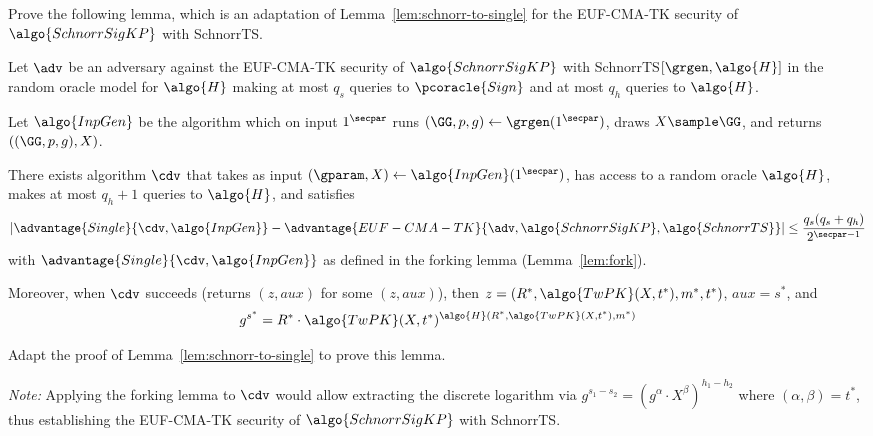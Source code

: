 \begin{exercise}\label{ex:schnorrkp-to-single}
  Prove the following lemma, which is an adaptation of Lemma~\ref{lem:schnorr-to-single} for the EUF-CMA-TK security of $\algo{SchnorrSigKP}$ with SchnorrTS.
  
  \begin{lemma}\label{lem:schnorrkp-to-single}
    Let $\adv$ be an adversary against the EUF-CMA-TK security of $\algo{SchnorrSigKP}$ with SchnorrTS$[\grgen, \algo{H}]$ in the random oracle model for $\algo{H}$ making at most $q_s$ queries to $\pcoracle{Sign}$ and at most $q_h$ queries to $\algo{H}$.
    
    Let $\algo{InpGen}$ be the algorithm which on input $1^\secpar$ runs $(\GG, p, g) \gets \grgen(1^\secpar)$, draws $X \sample \GG$, and returns $((\GG, p, g), X)$.
    
    There exists algorithm $\cdv$ that takes as input $(\gparam, X) \gets \algo{InpGen}(1^\secpar)$, has access to a random oracle $\algo{H}$, makes at most $q_h + 1$ queries to $\algo{H}$, and satisfies
    \[
      \left|\advantage{Single}{\cdv, \algo{InpGen}} - \advantage{EUF-CMA-TK}{\adv, \algo{SchnorrSigKP}, \algo{SchnorrTS}}\right| \leq \frac{q_s(q_s + q_h)}{2^{\secpar-1}}
    \]
    with $\advantage{Single}{\cdv, \algo{InpGen}}$ as defined in the forking lemma (Lemma~\ref{lem:fork}).
    
    Moreover, when $\cdv$ succeeds (returns $(z, \mathit{aux})$ for some $(z, \mathit{aux})$), then $z = (R^*, \algo{TwPK}(X, t^*), m^*, t^*)$, $\mathit{aux} = s^*$, and
    \[
      g^{s^*} = R^* \cdot \algo{TwPK}(X, t^*)^{\algo{H}(R^*, \algo{TwPK}(X, t^*), m^*)}
    \]
  \end{lemma}
  
  Adapt the proof of Lemma~\ref{lem:schnorr-to-single} to prove this lemma.
  
  \emph{Note:} Applying the forking lemma to $\cdv$ would allow extracting the discrete logarithm via $g^{s_1 - s_2} = (g^\alpha \cdot X^\beta)^{h_1 - h_2}$ where $(\alpha, \beta) = t^*$, thus establishing the EUF-CMA-TK security of $\algo{SchnorrSigKP}$ with SchnorrTS.
\end{exercise}

